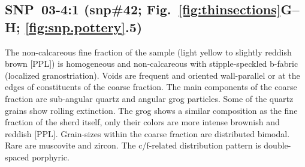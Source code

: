 \documentclass[a4paper]{article}
\begin{document}
\newpage\subsection{SNP~03-4:1 (snp\#42; Fig.~\ref{fig:thinsections}G--H; \ref{fig:snp.pottery}.5)}

\begin{multicols}{2}
\noindent The non-calcareous fine fraction of the sample (light yellow to slightly reddish brown [PPL]) is homogeneous and non-calcareous with stipple-speckled b-fabric (localized granostriation). Voids are frequent and oriented wall-parallel or at the edges of constituents of the coarse fraction. The main components of the coarse fraction are sub-angular quartz and angular grog particles. Some of the quartz grains show rolling extinction. The grog shows a similar composition as the fine fraction of the sherd itself, only their colors are more intense brownish and reddish [PPL]. Grain-sizes within the coarse fraction are distributed bimodal. Rare are muscovite and zircon. The c/f-related distribution pattern is double-spaced porphyric.
\end{multicols}
\end{document}
